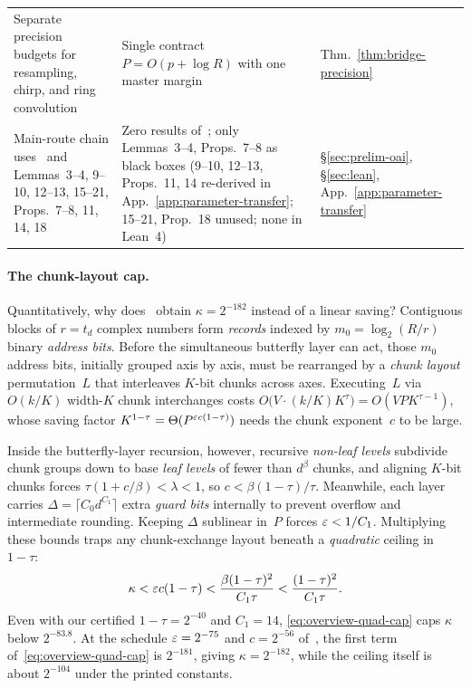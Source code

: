 \begin{table}[!ht]
\begin{tabular}{@{}>{\raggedright}p{}>{\raggedright}p{}>{\raggedright\arraybackslash}p{}@{}}
Separate precision budgets for resampling, chirp, and ring convolution & Single contract $P=O(p+\log R)$ with one master margin & Thm.~\ref{thm:bridge-precision} \\\addlinespace[1pt]
Main-route chain uses~\cite{HvdH21} and~\cite{OAI26} Lemmas~3--4, 9--10, 12--13, 15--21, Props.~7--8, 11, 14, 18 & Zero results of~\cite{HvdH21}; only~\cite{OAI26} Lemmas~3--4, Props.~7--8 as black boxes (9--10, 12--13, Props.~11, 14 re-derived in App.~\ref{app:parameter-transfer}; 15--21, Prop.~18 unused; none in Lean~4) & \S\ref{sec:prelim-oai}, \S\ref{sec:lean}, App.~\ref{app:parameter-transfer} \\
\bottomrule
\end{tabular}
\end{table}

\paragraph{The chunk-layout cap.}
Quantitatively, why does~\cite{OAI26} obtain $\kappa=2^{-182}$ instead of a linear saving? Contiguous blocks of $r=t_d$ complex numbers form \emph{records} indexed by $m_0=\log_2(R/r)$ binary \emph{address bits}. Before the simultaneous butterfly layer can act, those $m_0$ address bits, initially grouped axis by axis, must be rearranged by a \emph{chunk layout} permutation~$L$ that interleaves $K$-bit chunks across axes. Executing~$L$ via $O(k/K)$ width-$K$ chunk interchanges costs $O\bigl(V\cdot (k/K)K^{\tau}\bigr)=O(V P K^{\tau-1})$, whose saving factor $K^{1-\tau}=\Theta(P^{\varepsilon c(1-\tau)})$ needs the chunk exponent~$c$ to be large.

Inside the butterfly-layer recursion, however, recursive \emph{non-leaf levels} subdivide chunk groups down to base \emph{leaf levels} of fewer than $d^\beta$ chunks, and aligning $K$-bit chunks forces $\tau(1+c/\beta)<\lambda<1$, so $c<\beta(1-\tau)/\tau$. Meanwhile, each layer carries $\Delta=\lceil C_0 d^{C_1}\rceil$ extra \emph{guard bits} internally to prevent overflow and intermediate rounding. Keeping $\Delta$ sublinear in~$P$ forces $\varepsilon<1/C_1$. Multiplying these bounds traps any chunk-exchange layout beneath a \emph{quadratic} ceiling in $1-\tau$:
\begin{equation}\label{eq:overview-quad-cap}
  \kappa < \varepsilon c(1-\tau) < \frac{\beta(1-\tau)^2}{C_1\tau} < \frac{(1-\tau)^2}{C_1\tau}.
\end{equation}
Even with our certified $1-\tau=2^{-40}$ and $C_1=14$, \eqref{eq:overview-quad-cap} caps $\kappa$ below $2^{-83.8}$. At the schedule $\varepsilon=2^{-75}$ and $c=2^{-56}$ of~\cite[(38)]{OAI26}, the first term of~\eqref{eq:overview-quad-cap} is $2^{-181}$, giving $\kappa=2^{-182}$, while the ceiling itself is about $2^{-104}$ under the printed constants.

